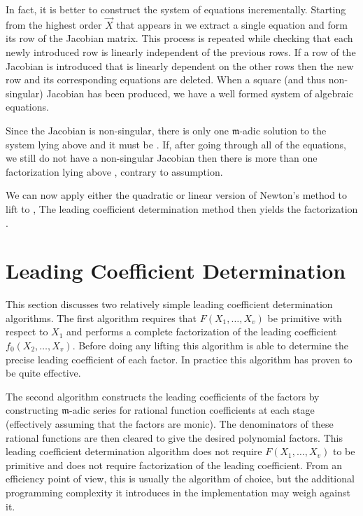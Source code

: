 In fact, it is better to construct the system of equations
incrementally.  Starting from the highest order $\vec{X}$ that appears
in  we extract a single equation and form its
row of the Jacobian matrix.  This process is repeated while checking
that each newly introduced row is linearly independent of the previous
rows.  If a row of the Jacobian is introduced that is linearly
dependent on the other rows then the new row and its corresponding
equations are deleted. When a square (and thus non-singular) Jacobian
has been produced, we have a well formed system of algebraic
equations.

Since the Jacobian is non-singular, there is only one $\mathfrak{m}$-adic
solution to the system lying above  and it must
be .  If, after going through all of the
equations, we still do not have a non-singular Jacobian then there is
more than one factorization lying above ,
contrary to assumption.

We can now apply either the quadratic or linear version of Newton's
method to lift  to ,
The leading coefficient determination method then yields the
factorization .

\section{Leading Coefficient Determination}
\label{GF:LC:Sec}

This section discusses two relatively simple leading coefficient
determination algorithms.   The first algorithm requires that $F(X_1,
\ldots, X_v)$ be primitive with respect to $X_1$ and performs a
complete factorization of the leading coefficient $f_0(X_2, \ldots,
X_v)$.  Before doing any lifting this algorithm is able to determine
the precise leading coefficient of each factor.  In practice this
algorithm has proven to be quite effective.

The second algorithm constructs the leading coefficients of the
factors by constructing $\mathfrak{m}$-adic series for rational function
coefficients at each stage (effectively assuming that the factors are
monic).  The denominators of these rational functions are then cleared
to give the desired polynomial factors.  This leading coefficient
determination algorithm does not require $F(X_1, \ldots, X_v)$ to be
primitive and does not require factorization of the leading
coefficient.  From an efficiency point of view, this is usually the
algorithm of choice, but the additional programming complexity it
introduces in the implementation may weigh against it.

